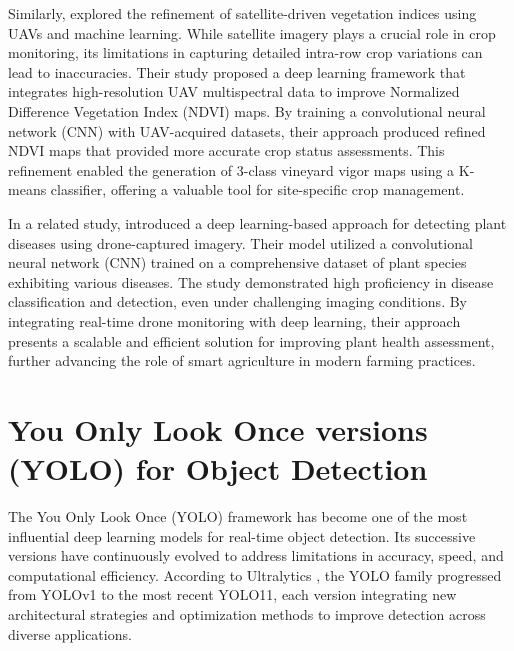 Similarly, \cite{Mazzia2020} explored the refinement of satellite-driven vegetation indices using UAVs and machine learning. While satellite imagery plays a crucial role in crop monitoring, its limitations in capturing detailed intra-row crop variations can lead to inaccuracies. Their study proposed a deep learning framework that integrates high-resolution UAV multispectral data to improve Normalized Difference Vegetation Index (NDVI) maps. By training a convolutional neural network (CNN) with UAV-acquired datasets, their approach produced refined NDVI maps that provided more accurate crop status assessments. This refinement enabled the generation of 3-class vineyard vigor maps using a K-means classifier, offering a valuable tool for site-specific crop management.

In a related study, \cite{Vardhan2023} introduced a deep learning-based approach for detecting plant diseases using drone-captured imagery. Their model utilized a convolutional neural network (CNN) trained on a comprehensive dataset of plant species exhibiting various diseases. The study demonstrated high proficiency in disease classification and detection, even under challenging imaging conditions. By integrating real-time drone monitoring with deep learning, their approach presents a scalable and efficient solution for improving plant health assessment, further advancing the role of smart agriculture in modern farming practices.

\section{You Only Look Once versions (YOLO) for Object Detection}
The You Only Look Once (YOLO) framework has become one of the most influential deep learning models for real-time object detection. Its successive versions have continuously evolved to address limitations in accuracy, speed, and computational efficiency. According to Ultralytics \cite{Terven2023}, the YOLO family progressed from YOLOv1 to the most recent YOLO11, each version integrating new architectural strategies and optimization methods to improve detection across diverse applications.

